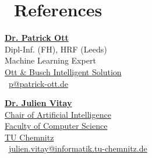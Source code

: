 \documentclass[]{resume}
\begin{document}
\begin{minipage}[t]{0.66\textwidth}

\section{{\faGroup~}References} 
\begin{minipage}{0.5\textwidth}
\begin{flushleft}
{\large \bf\href{http://patrick-ott.de}{Dr. Patrick Ott}} \\
Dipl-Inf. (FH), HRF (Leeds)\\
Machine Learning Expert\\
\href{http://www.ott-busch.com}{Ott \& Busch Intelligent Solution} \\
\href{mailto:p@patrick-ott.de}{\small\faEnvelopeAlt}~\href{mailto:p@patrick-ott.de}{p@patrick-ott.de}
\end{flushleft}
\end{minipage} \hspace{-1cm}
\begin{minipage}{0.5\textwidth}
\begin{flushleft}
{\large\bf\href{https://www-user.tu-chemnitz.de/~vitay/}{Dr. Julien Vitay}} \\
\href{https://www.tu-chemnitz.de/informatik/KI}{Chair of Artificial Intelligence}\\
\href{https://www.tu-chemnitz.de/informatik}{Faculty of Computer Science}\\
\href{https://www.tu-chemnitz.de}{TU Chemnitz} \\
\href{mailto:julien.vitay@informatik.tu-chemnitz.de}{\small\faEnvelopeAlt}~\href{mailto:julien.vitay@informatik.tu-chemnitz.de}{julien.vitay@informatik.tu-chemnitz.de}
\end{flushleft} 
\end{minipage}
\endsubsection

\end{minipage} 
\end{document}
